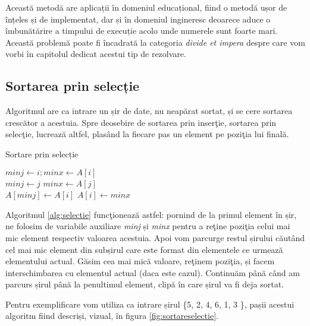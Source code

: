 Această metodă are aplicații în domeniul educațional, fiind o metodă ușor de înțeles și de implementat, dar și în domeniul ingineresc deoarece aduce o îmbunătărire a timpului de execuție acolo unde numerele sunt foarte mari. 
Această problemă poate fi încadrată la categoria \textit{divide et impera} despre care vom vorbi în capitolul dedicat acestui tip de rezolvare.

\subsection{Sortarea prin selecție}

Algoritmul are ca intrare un șir de date, nu neapărat sortat, și se cere sortarea crescător a acestuia. Spre deosebire de sortarea prin inserţie, sortarea prin selecţie, lucrează altfel, plasând la fiecare pas un element pe poziţia lui finală.

\begin{algorithm}
	\caption{Sortare prin selecție}\label{alg:selectie}
	\begin{algorithmic}[1]
		
		\State $minj \gets i;minx \gets A[i]$\\
		 \hfill \tab{}\tab{}\tab{}
		\For {j $\gets$ i+1 \textbf{to} n}
		\If {$A[j]<minx$}		
		\State $minj \gets j$
		\State $minx \gets A[j]$
		\EndIf
		\EndFor \\
		 \hfill \tab{}
		\State $A[minj] \gets A[i]$
		\State $A[i] \gets minx$
		\EndFor 
		\EndProcedure
	\end{algorithmic}
\end{algorithm}

Algoritmul \ref{alg:selectie} funcţionează astfel: pornind de la primul element în șir, ne folosim de variabile auxiliare \textit{minj} și \textit{minx} pentru a reţine poziţia celui mai mic element respectiv valoarea acestuia. Apoi vom parcurge restul șirului căutând cel mai mic element din subșirul care este format din elementele ce urmează elementului actual. Găsim cea mai mică valoare, reţinem poziţia, și facem interschimbarea cu elementul actual (daca este cazul). Continuăm până când am parcurs șirul până la penultimul element, clipă în care șirul va fi deja sortat.

Pentru exemplificare vom utiliza ca intrare șirul \{5, 2, 4, 6, 1, 3 \}, pașii acestui algoritm fiind descriși, vizual, în figura \ref{fig:sortareselectie}.

